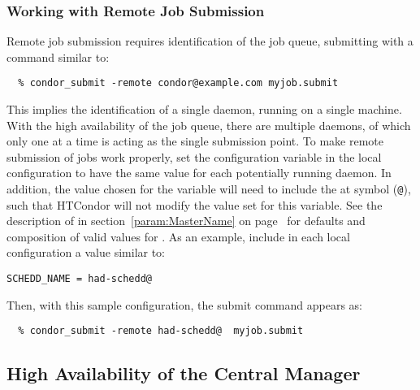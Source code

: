 \subsubsection{\label{sec:HA-remote-submit} Working with Remote Job Submission}

Remote job submission requires identification of the job queue,
submitting with a command similar to:
\footnotesize
\begin{verbatim}
  % condor_submit -remote condor@example.com myjob.submit
\end{verbatim}
\normalsize
This implies the identification of a single  daemon,
running on a single machine. 
With the high availability of the job queue, there are
multiple  daemons, of which only one at a time is acting
as the single submission point.
To make remote submission of jobs work properly,
set the configuration variable  in the local
configuration to have
the same value for each potentially running  daemon.
In addition, the value chosen for the variable 
will need to include the at symbol (\verb$@$),
such that HTCondor will not modify the value set for this variable.
See the description of  in
section~\ref{param:MasterName} on page~\pageref{param:MasterName}
for defaults and composition of valid values for .
As an example, include in each local configuration a value similar to:
\footnotesize
\begin{verbatim}
SCHEDD_NAME = had-schedd@
\end{verbatim}
\normalsize


Then, with this sample configuration, the 
submit command appears as:
\footnotesize
\begin{verbatim}
  % condor_submit -remote had-schedd@  myjob.submit
\end{verbatim}
\normalsize

\subsection{\label{sec:HA-negotiator} High Availability of the
Central Manager} 

